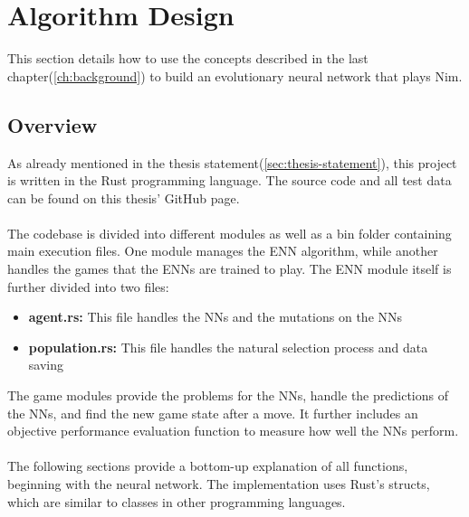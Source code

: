 \section{Algorithm Design}\label{sec:algorithm-design}
This section details how to use the concepts described in the last chapter(\ref{ch:background}) to build an evolutionary neural network that plays Nim.

\subsection{Overview}\label{subsec:overview}
As already mentioned in the thesis statement(\ref{sec:thesis-statement}), this project is written in the Rust programming language\cite{rust, rust23}.
The source code and all test data can be found on this thesis' GitHub page\cite{RustENN}.
\\ \\
The codebase is divided into different modules as well as a bin folder containing main execution files.
One module manages the ENN algorithm, while another handles the games that the ENNs are trained to play.
The ENN module itself is further divided into two files:
\begin{itemize}
    \item \textbf{agent.rs:} This file handles the NNs and the mutations on the NNs
    \item \textbf{population.rs:} This file handles the natural selection process and data saving
\end{itemize}
The game modules provide the problems for the NNs, handle the predictions of the NNs, and find the new game state after a move.
It further includes an objective performance evaluation function to measure how well the NNs perform.
\\ \\
The following sections provide a bottom-up explanation of all functions, beginning with the neural network.
The implementation uses Rust's structs, which are similar to classes in other programming languages.

